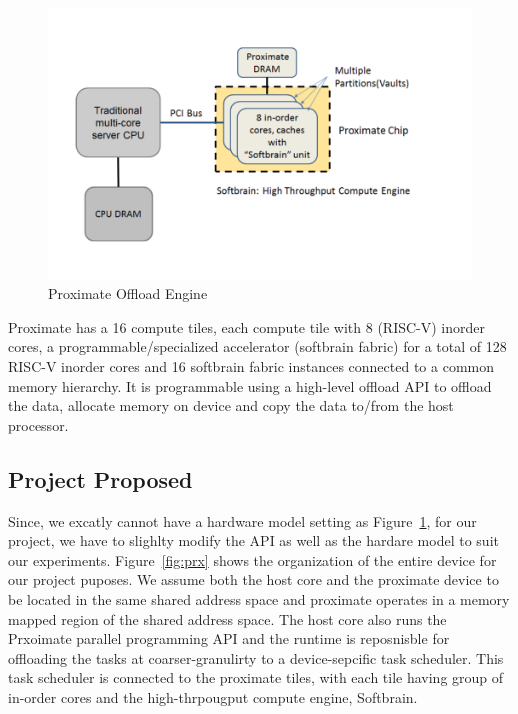 \begin{figure}
  \begin{center}
    \includegraphics[width=\linewidth]{cs758-figs/prx-orig.png}
  \end{center}
\vspace{-0.9in}
  \caption{Proximate Offload Engine}
  \label{fig:prx-orig}
\vspace{-0.05in}
\end{figure}

Proximate has a 16 compute tiles, 
each compute tile with 8 (RISC-V) inorder cores, 
a programmable/specialized accelerator (softbrain
fabric) for a total of 128 RISC-V inorder cores and 
16 softbrain fabric instances connected to a common 
memory hierarchy. It is programmable using a high-level 
offload API to offload the data, allocate memory on device and 
copy the data to/from the host processor. 


\subsection{Project Proposed}
Since, we excatly cannot have a hardware model setting as Figure~\ref{fig:prx-orig},
for our project, we have to slighlty modify the API as well as the hardare model to suit our experiments.
Figure~\ref{fig:prx} shows the organization of the entire device for our
project puposes. We assume both the host core and the proximate device
to be located in the same shared address space and proximate operates
in a memory mapped region of the shared address space. 
The host core also runs the Prxoimate parallel programming API and the runtime
is reposnisble for offloading the tasks at coarser-granulirty to a device-sepcific
task scheduler. This task scheduler is connected to the proximate tiles, with each tile
having group of in-order cores and the high-thrpougput compute engine, Softbrain. 

